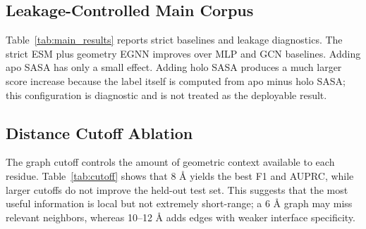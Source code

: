\documentclass[runningheads]{llncs}
\begin{document}
\subsection{Leakage-Controlled Main Corpus}

Table~\ref{tab:main_results} reports strict baselines and leakage diagnostics. The
strict ESM plus geometry EGNN improves over MLP and GCN baselines. Adding apo SASA has
only a small effect. Adding holo SASA produces a much larger score increase because the
label itself is computed from apo minus holo SASA; this configuration is diagnostic and
is not treated as the deployable result.

\begin{table}[t]
\centering
\caption{Held-out test performance. Holo-aware rows are leakage diagnostics, not strict predictors.}
\label{tab:main_results}
\end{table}

\subsection{Distance Cutoff Ablation}

The graph cutoff controls the amount of geometric context available to each residue.
Table~\ref{tab:cutoff} shows that 8 \AA{} yields the best F1 and AUPRC, while larger
cutoffs do not improve the held-out test set. This suggests that the most useful
information is local but not extremely short-range; a 6 \AA{} graph may miss relevant
neighbors, whereas 10--12 \AA{} adds edges with weaker interface specificity.
\end{document}
